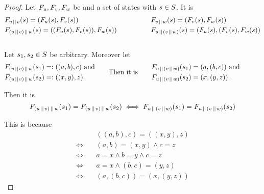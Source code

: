 \documentclass[preview]{standalone}
\begin{document}
\begin{proof}
Let $\grpfct[u], \grpfct[v], \grpfct[w]$ be \grpfctsN and \states a set of states with $\state \in \states$. It is
\begin{equation*}
	\begin{aligned}[c]
			&\grpfct[u \pll v](\state) = (\grpfct[u](\state), \grpfct[v](\state)) \\
			&\grpfct[(u \pll v) \pll w](\state) = ((\grpfct[u](\state), \grpfct[v](\state)), \grpfct[w](\state))
		\end{aligned}
	\quad\quad\quad\quad\quad
	\begin{aligned}[c]
			&\grpfct[v \pll w](\state) = (\grpfct[v](\state), \grpfct[w](\state)) \\
			&\grpfct[u \pll (v \pll w)](\state) = (\grpfct[u](\state), (\grpfct[v](\state), \grpfct[w](\state))\\
		\end{aligned}					
\end{equation*}
\\
\noindent
Let $\state_1, \state_2 \in \states$ be arbitrary. Moreover let %
\begin{equation*}
	\begin{aligned}[c]
			&\grpfct[(u \pll v) \pll w](\state_1) =: ((a,b),c) \text{ and} \\
			&\grpfct[(u \pll v) \pll w](\state_2) =: ((x, y), z) \text{.}
		\end{aligned}
	\quad\quad\text{Then it is}\quad\quad
	\begin{aligned}[c]
			&\grpfct[u \pll (v \pll w)](\state_1) = (a, (b, c)) \text{ and} \\
			&\grpfct[u \pll (v \pll w)](\state_2) = (x, (y, z)).
		\end{aligned}
	\quad\quad\quad				
\end{equation*}

\noindent
Then it is
\[
	\grpfct[(u \pll v) \pll w](\state_1) = \grpfct[(u \pll v) \pll w](\state_2) \iff \grpfct[u \pll (v \pll w)](\state_1) = \grpfct[u \pll (v \pll w)](\state_2)
\]

\noindent
This is because
\begin{align*}
	&((a, b), c) = ((x, y), z) \\
	\iff \quad &(a, b) = (x, y) \land c = z \\
	\iff \quad &a = x \land b = y \land c = z \\
	\iff \quad &a = x \land (b, c) = (y, z) \\
	\iff \quad &(a, (b, c)) = (x, (y, z))
\end{align*}
\end{proof}
\end{document}
